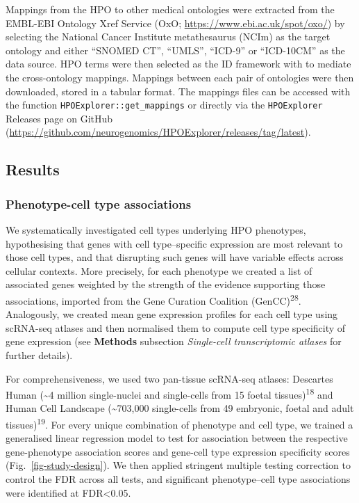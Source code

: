 \documentclass[
]{article}
\begin{document}
Mappings from the HPO to other medical ontologies were extracted from
the EMBL-EBI Ontology Xref Service (OxO;
\url{https://www.ebi.ac.uk/spot/oxo/}) by selecting the National Cancer
Institute metathesaurus (NCIm) as the target ontology and either
``SNOMED CT'', ``UMLS'', ``ICD-9'' or ``ICD-10CM'' as the data source.
HPO terms were then selected as the ID framework with to mediate the
cross-ontology mappings. Mappings between each pair of ontologies were
then downloaded, stored in a tabular format. The mappings files can be
accessed with the function \texttt{HPOExplorer::get\_mappings} or
directly via the \texttt{HPOExplorer} Releases page on GitHub
(\url{https://github.com/neurogenomics/HPOExplorer/releases/tag/latest}).

\subsection{Results}\label{sec-results}

\subsubsection{Phenotype-cell type
associations}\label{phenotype-cell-type-associations-1}

We systematically investigated cell types underlying HPO phenotypes,
hypothesising that genes with cell type--specific expression are most
relevant to those cell types, and that disrupting such genes will have
variable effects across cellular contexts. More precisely, for each
phenotype we created a list of associated genes weighted by the strength
of the evidence supporting those associations, imported from the Gene
Curation Coalition (GenCC)\textsuperscript{28}. Analogously, we created
mean gene expression profiles for each cell type using scRNA-seq atlases
and then normalised them to compute cell type specificity of gene
expression (see \textbf{Methods} subsection \emph{Single-cell
transcriptomic atlases} for further details).

For comprehensiveness, we used two pan-tissue scRNA-seq atlases:
Descartes Human (\textasciitilde4 million single-nuclei and single-cells
from 15 foetal tissues)\textsuperscript{18} and Human Cell Landscape
(\textasciitilde703,000 single-cells from 49 embryonic, foetal and adult
tissues)\textsuperscript{19}. For every unique combination of phenotype
and cell type, we trained a generalised linear regression model to test
for association between the respective gene-phenotype association scores
and gene-cell type expression specificity scores
(Fig.~\ref{fig-study-design}). We then applied stringent multiple
testing correction to control the FDR across all tests, and significant
phenotype--cell type associations were identified at FDR\textless0.05.
\end{document}
